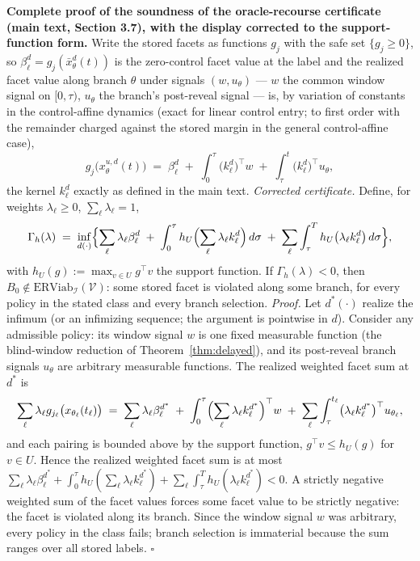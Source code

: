 \documentclass[11pt]{article}
\theoremstyle{definition}
\begin{document}
\bigskip
\noindent\textbf{Complete proof of the soundness of the oracle-recourse
certificate (main text, Section 3.7), with the display corrected to the
support-function form.}
Write the stored facets as functions \(g_{j}\) with the safe set
\(\{g_{j} \ge 0\}\), so \(\beta_{\ell}^{d} = g_{j}(\bar
x_{\theta}^{d}(t))\) is the zero-control facet value at the label and
the realized facet value along branch \(\theta\) under signals
\((w, u_{\theta})\) --- \(w\) the common window signal on \([0, \tau)\),
\(u_{\theta}\) the branch's post-reveal signal --- is, by variation of
constants in the control-affine dynamics (exact for linear control
entry; to first order with the remainder charged against the stored
margin in the general control-affine case),
\[
g_{j}\bigl(x_{\theta}^{u, d}(t)\bigr) \;=\; \beta_{\ell}^{d}
\;+\; \int_{0}^{\tau} \bigl(k_{\ell}^{d}\bigr)^{\top} w
\;+\; \int_{\tau}^{t} \bigl(k_{\ell}^{d}\bigr)^{\top} u_{\theta},
\]
the kernel \(k_{\ell}^{d}\) exactly as defined in the main text.
\emph{Corrected certificate.} Define, for weights
\(\lambda_{\ell} \ge 0\), \(\sum_{\ell} \lambda_{\ell} = 1\),
\[
\Gamma_{h}(\lambda) \;=\; \inf_{d(\cdot)} \Bigl\{ \sum_{\ell}
\lambda_{\ell} \beta_{\ell}^{d} \;+\; \int_{0}^{\tau}
h_{U}\Bigl(\sum_{\ell} \lambda_{\ell} k_{\ell}^{d}\Bigr)\, d\sigma
\;+\; \sum_{\ell} \int_{\tau}^{T} h_{U}\bigl(\lambda_{\ell}
k_{\ell}^{d}\bigr)\, d\sigma \Bigr\},
\]
with \(h_{U}(g) := \max_{v \in U} g^{\top} v\) the support function. If
\(\Gamma_{h}(\lambda) < 0\), then \(B_{0} \notin
\mathrm{ERViab}_{\mathcal{I}}(\mathcal{V})\): some stored facet is
violated along some branch, for every policy in the stated class and
every branch selection.
\emph{Proof.} Let \(d^{*}(\cdot)\) realize the infimum (or an
infimizing sequence; the argument is pointwise in \(d\)). Consider any
admissible policy: its window signal \(w\) is one fixed measurable
function (the blind-window reduction of
Theorem~\ref{thm:delayed}), and its post-reveal branch signals
\(u_{\theta}\) are arbitrary measurable functions. The realized
weighted facet sum at \(d^{*}\) is
\[
\sum_{\ell} \lambda_{\ell} g_{j_{\ell}}\bigl(x_{\theta_{\ell}}(t_{\ell})
\bigr) \;=\; \sum_{\ell} \lambda_{\ell} \beta_{\ell}^{d^{*}}
\;+\; \int_{0}^{\tau} \Bigl(\sum_{\ell} \lambda_{\ell}
k_{\ell}^{d^{*}}\Bigr)^{\top} w \;+\; \sum_{\ell} \int_{\tau}^{t_{\ell}}
\bigl(\lambda_{\ell} k_{\ell}^{d^{*}}\bigr)^{\top} u_{\theta_{\ell}},
\]
and each pairing is bounded above by the support function,
\(g^{\top} v \le h_{U}(g)\) for \(v \in U\). Hence the realized weighted
facet sum is at most
\(\sum_{\ell} \lambda_{\ell} \beta_{\ell}^{d^{*}} + \int_{0}^{\tau}
h_{U}(\sum_{\ell} \lambda_{\ell} k_{\ell}^{d^{*}}) + \sum_{\ell}
\int_{\tau}^{T} h_{U}(\lambda_{\ell} k_{\ell}^{d^{*}}) < 0\). A strictly
negative weighted sum of the facet values forces some facet value to be
strictly negative: the facet is violated along its branch. Since the
window signal \(w\) was arbitrary, every policy in the class fails;
branch selection is immaterial because the sum ranges over all stored
labels. \(\square\)
\end{document}
